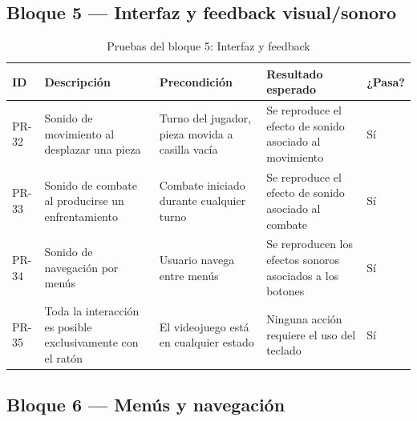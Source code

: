 \clearpage

\subsection{Bloque 5 — Interfaz y feedback visual/sonoro}

\begin{table}[H]
	\centering
	\small
	\begin{tabular}{|>{\centering\arraybackslash}p{1cm}|>{\centering\arraybackslash}p{4cm}|>{\centering\arraybackslash}p{4cm}|>{\centering\arraybackslash}p{4cm}|>{\centering\arraybackslash}p{1.5cm}|}
		\hline
		\textbf{ID} & \textbf{Descripción} & \textbf{Precondición} & \textbf{Resultado esperado} & \textbf{¿Pasa?} \\
		\hline
		PR-32 & Sonido de movimiento al desplazar una pieza & Turno del jugador, pieza movida a casilla vacía & Se reproduce el efecto de sonido asociado al movimiento & \cellcolor{green!40}Sí \\
		\hline
		PR-33 & Sonido de combate al producirse un enfrentamiento & Combate iniciado durante cualquier turno & Se reproduce el efecto de sonido asociado al combate & \cellcolor{green!40}Sí \\
		\hline
		PR-34 & Sonido de navegación por menús & Usuario navega entre menús & Se reproducen los efectos sonoros asociados a los botones & \cellcolor{green!40}Sí \\
		\hline
		PR-35 & Toda la interacción es posible exclusivamente con el ratón & El videojuego está en cualquier estado & Ninguna acción requiere el uso del teclado & \cellcolor{green!40}Sí \\
		\hline
	\end{tabular}
	\caption{Pruebas del bloque 5: Interfaz y feedback}
\end{table}

\clearpage

\subsection{Bloque 6 — Menús y navegación}

